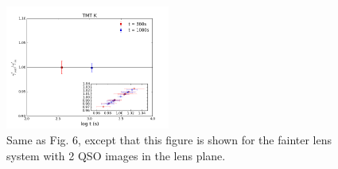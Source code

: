 \documentclass[a4paper,11pt]{article}
\begin{document}
\begin{figure}
\begin{center}
\includegraphics[width=0.48\textwidth]{gamma_135949_anti_2QSOimages_TMT.png}
\end{center}
\caption{Same as Fig. 6, except that this figure is shown for the fainter lens system with 2 QSO images in the lens plane.}
\label{fig:gamma_fainter_2QSOimages}
\end{figure}
\end{document}
